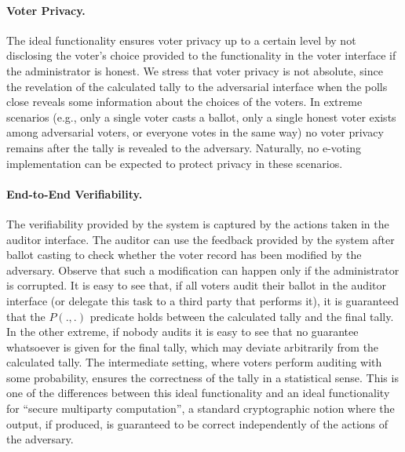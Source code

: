 \paragraph{Voter Privacy.}  The ideal functionality ensures voter
privacy up to a certain level by not disclosing the voter's choice
provided to the functionality in the voter interface if the
administrator is honest. We stress that voter privacy is not absolute,
since the revelation of the calculated tally to the adversarial
interface when the polls close reveals some information about the
choices of the voters. In extreme scenarios (e.g., only a single voter
casts a ballot, only a single honest voter exists among adversarial
voters, or everyone votes in the same way) no voter privacy remains
after the tally is revealed to the adversary. Naturally, no e-voting
implementation can be expected to protect privacy in these scenarios.

\paragraph{End-to-End Verifiability.} The verifiability provided by
the system is captured by the actions taken in the auditor
interface. The auditor can use the feedback provided by the system
after ballot casting to check whether the voter record has been
modified by the adversary. Observe that such a modification can happen
only if the administrator is corrupted. It is easy to see that, if all
voters audit their ballot in the auditor interface (or delegate this
task to a third party that performs it), it is guaranteed that the
$P(.,.)$ predicate holds between the calculated tally and the final
tally. In the other extreme, if nobody audits it is easy to see that
no guarantee whatsoever is given for the final tally, which may
deviate arbitrarily from the calculated tally. The intermediate
setting, where voters perform auditing with some probability, ensures
the correctness of the tally in a statistical sense. This is one of
the differences between this ideal functionality and an ideal
functionality for ``secure multiparty computation'', a standard
cryptographic notion where the output, if produced, is guaranteed to
be correct independently of the actions of the adversary.

